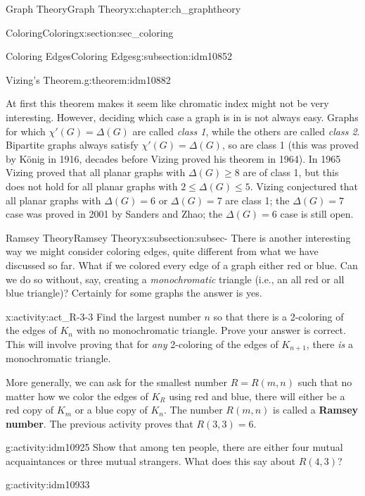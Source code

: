 \documentclass[oneside,10pt,]{book}
\newcommand{\terminology}[1]{\textbf{#1}}
\numberwithin{equation}{chapter}
\begin{document}
\begin{chapterptx}{Graph Theory}{}{Graph Theory}{}{}{x:chapter:ch_graphtheory}
\begin{sectionptx}{Coloring}{}{Coloring}{}{}{x:section:sec_coloring}
\begin{subsectionptx}{Coloring Edges}{}{Coloring Edges}{}{}{g:subsection:idm10852}
\begin{theorem}{Vizing's Theorem.}{}{g:theorem:idm10882}
\end{theorem}
At first this theorem makes it seem like chromatic index might not be very interesting. However, deciding which case a graph is in is not always easy. Graphs for which \(\chi'(G) = \Delta(G)\) are called \emph{class 1}, while the others are called \emph{class 2}. Bipartite graphs always satisfy \(\chi'(G) = \Delta(G)\), so are class 1 (this was proved by König in 1916, decades before Vizing proved his theorem in 1964). In 1965 Vizing proved that all planar graphs with \(\Delta(G) \ge 8\) are of class 1, but this does not hold for all planar graphs with \(2 \le \Delta(G) \le 5\). Vizing conjectured that all planar graphs with \(\Delta(G) = 6\) or \(\Delta(G) = 7\) are class 1; the \(\Delta(G) = 7\) case was proved in 2001 by Sanders and Zhao; the \(\Delta(G) = 6\) case is still open.%
\end{subsectionptx}
%
%
\typeout{************************************************}
\typeout{************************************************}
%
\begin{subsectionptx}{Ramsey Theory}{}{Ramsey Theory}{}{}{x:subsection:subsec-}
There is another interesting way we might consider coloring edges, quite different from what we have discussed so far. What if we colored every edge of a graph either red or blue. Can we do so without, say, creating a \emph{monochromatic} triangle (i.e., an all red or all blue triangle)? Certainly for some graphs the answer is yes.%
\begin{activity}{}{x:activity:act_R-3-3}%
Find the largest number \(n\) so that there is a 2-coloring of the edges of \(K_n\) with no monochromatic triangle.  Prove your answer is correct.  This will involve proving that for \emph{any} 2-coloring of the edges of \(K_{n+1}\), there \emph{is} a monochromatic triangle.%
\end{activity}
More generally, we can ask for the smallest number \(R = R(m,n)\) such that no matter how we color the edges of \(K_R\) using red and blue, there will either be a red copy of \(K_m\) or a blue copy of \(K_n\).  The number \(R(m,n)\) is called a \terminology{Ramsey number}.  The previous activity proves that \(R(3,3) = 6\).%
\begin{activity}{}{g:activity:idm10925}%
Show that among ten people, there are either four mutual acquaintances or three mutual strangers.  What does this say about \(R(4,3)\)?%
\end{activity}
\begin{activity}{}{g:activity:idm10933}%

\end{activity}
\end{subsectionptx}
\end{sectionptx}
\end{chapterptx}
\end{document}
